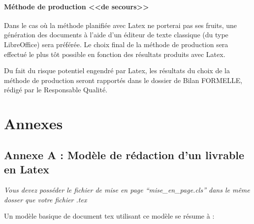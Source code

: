 \documentclass{mise_en_page}
\begin{document}
\paragraph{Méthode de
production <<de secours>>}
Dans le cas où la méthode planifiée avec Latex ne porterai pas ses
fruits, une génération des documents à l’aide d’un éditeur de texte
classique (du type LibreOffice) sera préférée. Le choix final de la
méthode de production sera effectué le plus tôt possible en fonction
des résultats produits avec Latex.




Du fait du risque potentiel engendré par Latex, les résultats du choix
de la méthode de production seront rapportés dans le dossier de Bilan
FORMELLE, rédigé par le Responsable Qualité.

\section{Annexes}
\subsection{Annexe A : Modèle de rédaction d’un livrable en Latex}
\emph{Vous devez posséder le fichier de mise en page “mise\_en\_page.cls” dans le
même dosser que votre fichier .tex}

Un modèle basique de document tex utilisant ce modèle se résume à :
\end{document}
